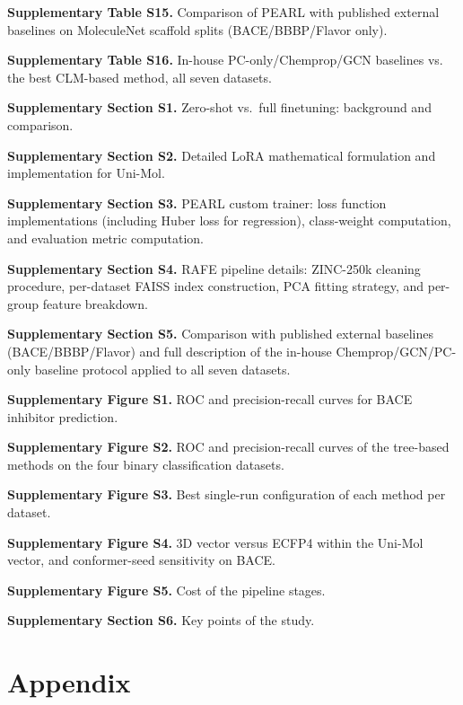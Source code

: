 \documentclass[pdflatex,sn-mathphys-num,Numbered]{sn-jnl}%
\begin{document}
\noindent \textbf{Supplementary Table S15.} Comparison of PEARL with published external baselines on MoleculeNet scaffold splits (BACE/BBBP/Flavor only).

\noindent \textbf{Supplementary Table S16.} In-house PC-only/Chemprop/GCN baselines vs. the best CLM-based method, all seven datasets.

\noindent\textbf{Supplementary Section S1.} Zero-shot vs.\ full finetuning: background and comparison.

\noindent\textbf{Supplementary Section S2.} Detailed LoRA mathematical formulation and implementation for Uni-Mol.

\noindent\textbf{Supplementary Section S3.} PEARL custom trainer: loss function implementations (including Huber loss for regression), class-weight computation, and evaluation metric computation.

\noindent\textbf{Supplementary Section S4.} RAFE pipeline details: ZINC-250k cleaning procedure, per-dataset FAISS index construction, PCA fitting strategy, and per-group feature breakdown.

\noindent\textbf{Supplementary Section S5.} Comparison with published external baselines (BACE/BBBP/Flavor) and full description of the in-house Chemprop/GCN/PC-only baseline protocol applied to all seven datasets.

\noindent\textbf{Supplementary Figure S1.} ROC and precision-recall curves for BACE inhibitor prediction.

\noindent\textbf{Supplementary Figure S2.} ROC and precision-recall curves of the tree-based methods on the four binary classification datasets.

\noindent\textbf{Supplementary Figure S3.} Best single-run configuration of each method per dataset.

\noindent\textbf{Supplementary Figure S4.} 3D vector versus ECFP4 within the Uni-Mol vector, and conformer-seed sensitivity on BACE.

\noindent\textbf{Supplementary Figure S5.} Cost of the pipeline stages.

\noindent\textbf{Supplementary Section S6.} Key points of the study.

\section*{Appendix}

\end{document}
